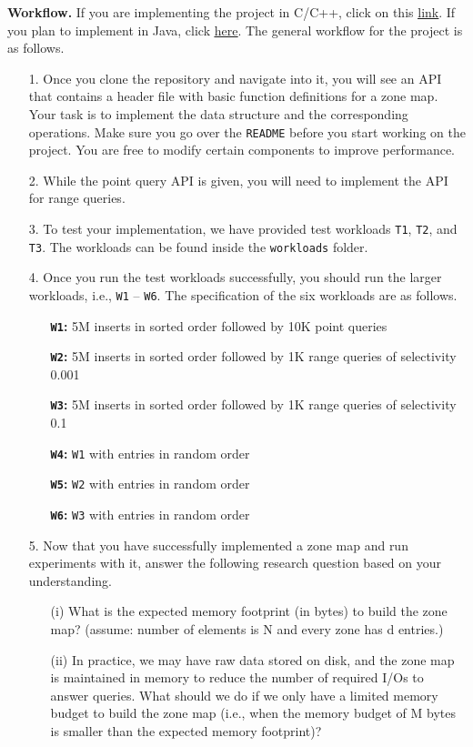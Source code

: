 \documentclass[12pt,a4paper,twoside]{article}
\begin{document}
\noindent \textbf{Workflow.} If you are implementing the project in C/C++, click on this \href{https://github.com/SSD-Brandeis/ZoneMaps-CPP}{\underline{link}}. 
If you plan to implement in Java, click \href{https://github.com/SSD-Brandeis/ZoneMaps-Java}{\underline{here}}. 
The general workflow for the project is as follows.

\begin{enumerate}
    \item[1.] Once you clone the repository and navigate into it, you will see an API that contains a header file with basic function definitions for a zone map. Your task is to implement the data structure and the corresponding operations. 
    Make sure you go over the \texttt{README} before you start working on the project. 
    You are free to modify certain components to improve performance. 
    \item[2.] While the point query API is given, you will need to implement the API for range queries. 
    \item[3.] To test your implementation, we have provided test workloads \texttt{T1}, \texttt{T2}, and \texttt{T3}. The workloads can be found inside the \texttt{workloads} folder. 
    \item[4.] Once you run the test workloads successfully, you should run the larger workloads, i.e., \texttt{W1} -- \texttt{W6}. 
    The specification of the six workloads are as follows. 
    \begin{enumerate}
        \item[\textbf{\texttt{W1}:}] 5M inserts in sorted order followed by 10K point queries 
        \item[\textbf{\texttt{W2}:}] 5M inserts in sorted order followed by 1K range queries of selectivity 0.001
        \item[\textbf{\texttt{W3}:}] 5M inserts in sorted order followed by 1K range queries of selectivity 0.1
        \item[\textbf{\texttt{W4}:}] \texttt{W1} with entries in random order
        \item[\textbf{\texttt{W5}:}] \texttt{W2} with entries in random order
        \item[\textbf{\texttt{W6}:}] \texttt{W3} with entries in random order
    \end{enumerate}
    \item[5.] Now that you have successfully implemented a zone map and run experiments with it, answer the following research question based on your understanding. \begin{enumerate}
        \item[(i)] What is the expected memory footprint (in bytes) to build the zone map? (assume: number of elements is N and every zone has d entries.) 
        \item[(ii)] In practice, we may have raw data stored on disk, and the zone map is maintained in memory to reduce the number of required I/Os to answer queries. What should we do if we only have a limited memory budget to build the zone map (i.e., when the memory budget of M bytes is smaller than the expected memory footprint)? 
    \end{enumerate}
\end{enumerate}
\end{document}
